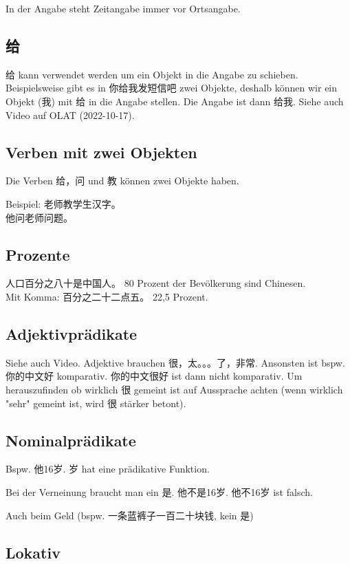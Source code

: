 \documentclass[UTF8]{ctexart}
\begin{document}
In der Angabe steht Zeitangabe immer vor Ortsangabe.

\subsection{给}

给 kann verwendet werden um ein Objekt in die Angabe zu schieben. Beispielsweise gibt es in 你给我发短信吧 zwei Objekte, deshalb können wir ein Objekt (我) mit 给 in die Angabe stellen. Die Angabe ist dann 给我. Siehe auch Video auf OLAT (2022-10-17).

\subsection{Verben mit zwei Objekten}

Die Verben 给，问 und 教 können zwei Objekte haben.

Beispiel: 老师教学生汉字。\\
他问老师问题。

\subsection{Prozente}

人口百分之八十是中国人。 80 Prozent der Bevölkerung sind Chinesen.\\
Mit Komma: 百分之二十二点五。 22,5 Prozent.

\subsection{Adjektivprädikate}

Siehe auch Video. Adjektive brauchen 很，太。。。了，非常. Ansonsten ist bspw. 你的中文好 komparativ. 你的中文很好 ist dann nicht komparativ. Um herauszufinden ob wirklich 很 gemeint ist auf Aussprache achten (wenn wirklich "sehr" gemeint ist, wird 很 stärker betont).

\subsection{Nominalprädikate}

Bspw. 他16岁. 岁 hat eine prädikative Funktion.

Bei der Verneinung braucht man ein 是. 他不是16岁. 他不16岁 ist falsch.

Auch beim Geld (bspw. 一条蓝裤子一百二十块钱, kein 是)

\subsection{Lokativ}
\end{document}
